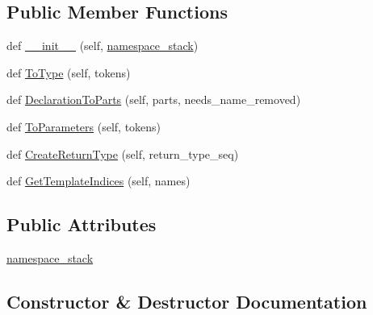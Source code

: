 \subsection*{Public Member Functions}
\begin{DoxyCompactItemize}
\item 
def \hyperlink{classcpp_1_1ast_1_1_type_converter_ae6e75773d6722cdbb96d510a49cb633a}{\+\_\+\+\_\+init\+\_\+\+\_\+} (self, \hyperlink{classcpp_1_1ast_1_1_type_converter_abb739f15c6cd0800e07c086c2b30833e}{namespace\+\_\+stack})
\item 
def \hyperlink{classcpp_1_1ast_1_1_type_converter_aa6ea82e40cd30e5dfcd471ff144a19cf}{To\+Type} (self, tokens)
\item 
def \hyperlink{classcpp_1_1ast_1_1_type_converter_a7c9d20d107c2bc0eb80afdf04957825f}{Declaration\+To\+Parts} (self, parts, needs\+\_\+name\+\_\+removed)
\item 
def \hyperlink{classcpp_1_1ast_1_1_type_converter_aeaf27fb1890f65d7216703df610b46d5}{To\+Parameters} (self, tokens)
\item 
def \hyperlink{classcpp_1_1ast_1_1_type_converter_a7e4d429131d9d5742ec44c78b61beb87}{Create\+Return\+Type} (self, return\+\_\+type\+\_\+seq)
\item 
def \hyperlink{classcpp_1_1ast_1_1_type_converter_a7b5244be5a0caedd769ae866f8a182aa}{Get\+Template\+Indices} (self, names)
\end{DoxyCompactItemize}
\subsection*{Public Attributes}
\begin{DoxyCompactItemize}
\item 
\hyperlink{classcpp_1_1ast_1_1_type_converter_abb739f15c6cd0800e07c086c2b30833e}{namespace\+\_\+stack}
\end{DoxyCompactItemize}


\subsection{Constructor \& Destructor Documentation}
\mbox{\label{classcpp_1_1ast_1_1_type_converter_ae6e75773d6722cdbb96d510a49cb633a}} 
